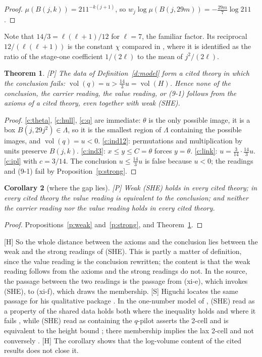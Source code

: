 \documentclass[11pt]{article}
\theoremstyle{plain}
\newtheorem{theorem}{Theorem}
\newtheorem{corollary}[theorem]{Corollary}
\theoremstyle{definition}
\theoremstyle{remark}
\newcommand{\Smark}{\textup{[S]}}
\newcommand{\Pmark}{\textup{[P]}}
\newcommand{\Hmark}{\textup{[H]}}
\newcommand{\vol}{\operatorname{vol}}
\begin{document}
\begin{proof}
$\mu(B(j,k))=211^{-k(j+1)}$, so $w_j\log\mu(B(j,29m))=-\frac{29m}{7}\log211$.
\end{proof}

Note that $14/3=\ell(\ell+1)/12$ for $\ell=7$, the familiar factor.  Its reciprocal
$12/(\ell(\ell+1))$ is the constant $\chi$ compared in \cite{Fifth}, where it is identified
as the ratio of the stage-one coefficient $1/(2\ell)$ to the mean of $j^2/(2\ell)$.

\begin{theorem}\label{t:main}
\Pmark{} The data of Definition~\ref{d:model} form a cited theory in which the conclusion
fails: $\vol(q)=u>\frac{14}3u=\vol(H)$. Hence none of the conclusion, the carrier reading,
the value reading, or (9-1) follows from the axioms of a cited theory, even together with
weak (SHE).
\end{theorem}

\begin{proof}
\ref{c:theta}, \ref{c:hull}, \ref{c:q} are immediate: $\theta$ is the only possible image,
it is a box $B(j,29j^2)\in\Lambda$, so it is the smallest region of $\Lambda$ containing
the possible images, and $\vol(q)=u<0$. \ref{c:ind12}: permutations and multiplication by
units preserve $B(j,k)$. \ref{c:ind3}: $x\le y\le C=\theta$ forces $y=\theta$.
\ref{c:link}: $u=\frac3{14}\cdot\frac{14}3u$. \ref{c:ipl} with $c=3/14$. The conclusion $u\le\frac{14}3u$ is false because $u<0$; the
readings and (9-1) fail by Proposition~\ref{p:strong}.
\end{proof}

\begin{corollary}[where the gap lies]\label{c:gap}
\Pmark{} Weak (SHE) holds in every cited theory; in every cited theory the value reading is
equivalent to the conclusion; and neither the carrier reading nor the value reading holds
in every cited theory.
\end{corollary}

\begin{proof}
Propositions~\ref{p:weak} and~\ref{p:strong}, and Theorem~\ref{t:main}.
\end{proof}

\Hmark{} So the whole distance between the axioms and the conclusion lies between the
weak and the strong readings of (SHE). This is partly a matter of definition, since the
value reading is the conclusion rewritten; the content is that the weak reading follows
from the axioms and the strong readings do not. In the source, the passage between the two
readings is the passage from (xi-e), which invokes (SHE), to (xi-f), which draws the
membership. \Smark{} Higuchi locates the same passage for his qualitative package
\cite{Higuchi}. In the one-number model of \cite[\S5]{SL}, (SHE) read as a property of the
shared data holds both where the inequality holds and where it fails
\cite[Theorem~5.7]{SL}, while (SHE) read as containing the $q$-pilot asserts the 2-cell and
is equivalent to the height bound \cite[Remark~5.8, Theorem~5.3]{SL}; there membership
implies the lax 2-cell and not conversely \cite[Proposition~6.1]{SL}. \Hmark{} The corollary shows that the log-volume content of the cited
results does not close it.
\end{document}
